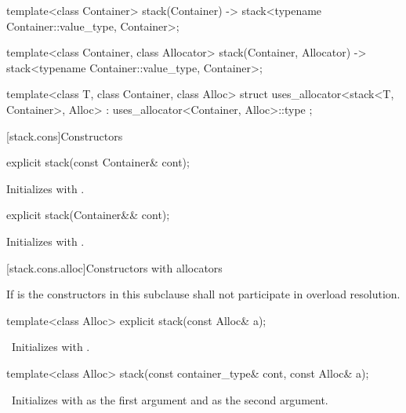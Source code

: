 \begin{codeblock}
\begin{codeblock}
\begin{codeblock}
\begin{codeblock}
{  template<class Container>
    stack(Container) -> stack<typename Container::value_type, Container>;

  template<class Container, class Allocator>
    stack(Container, Allocator) -> stack<typename Container::value_type, Container>;

  template<class T, class Container, class Alloc>
    struct uses_allocator<stack<T, Container>, Alloc>
      : uses_allocator<Container, Alloc>::type { };
}
\end{codeblock}

[stack.cons]{Constructors}

%
\begin{itemdecl}
explicit stack(const Container& cont);
\end{itemdecl}

\begin{itemdescr}
\pnum
\effects Initializes  with .
\end{itemdescr}

%
\begin{itemdecl}
explicit stack(Container&& cont);
\end{itemdecl}

\begin{itemdescr}
\pnum
\effects Initializes  with .
\end{itemdescr}

[stack.cons.alloc]{Constructors with allocators}

\pnum
If  is 
the constructors in this subclause shall not participate in overload resolution.

%
\begin{itemdecl}
template<class Alloc> explicit stack(const Alloc& a);
\end{itemdecl}

\begin{itemdescr}
\pnum
\effects\ Initializes  with .
\end{itemdescr}

%
\begin{itemdecl}
template<class Alloc> stack(const container_type& cont, const Alloc& a);
\end{itemdecl}

\begin{itemdescr}
\pnum
\effects\ Initializes  with  as the first argument and  as the
second argument.
\end{itemdescr}


\end{codeblock}
\end{codeblock}
\end{codeblock}
